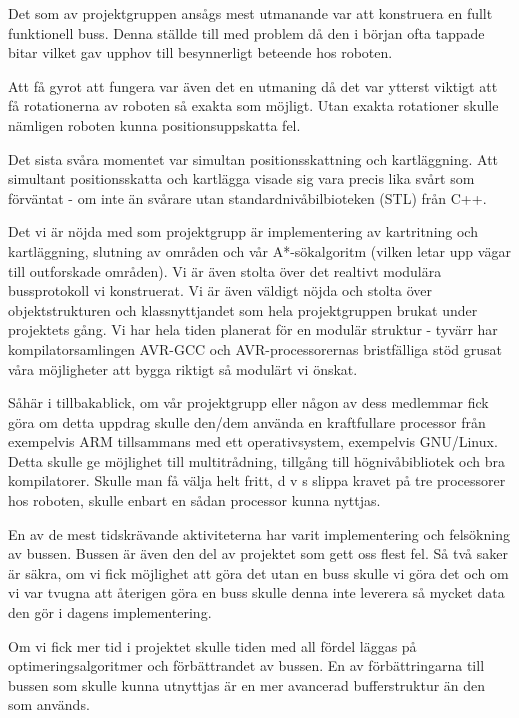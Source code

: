 \documentclass[a4paper,12pt,fleqn]{article}
\begin{document}
Det som av projektgruppen ansågs mest utmanande var att konstruera en fullt funktionell buss. Denna ställde till med problem då den i början ofta tappade bitar vilket gav upphov till besynnerligt beteende hos roboten. 

Att få gyrot att fungera var även det en utmaning då det var ytterst viktigt att få rotationerna av roboten så exakta som möjligt. Utan exakta rotationer skulle nämligen roboten kunna positionsuppskatta fel.

Det sista svåra momentet var simultan positionsskattning och kartläggning. Att simultant positionsskatta och kartlägga visade sig vara precis lika svårt som förväntat - om inte än svårare utan standardnivåbilbioteken (STL) från C++. 


Det vi är nöjda med som projektgrupp är implementering av kartritning och kartläggning, slutning av områden och vår A*-sökalgoritm (vilken letar upp vägar till outforskade områden). Vi är även stolta över det realtivt modulära bussprotokoll vi konstruerat. Vi är även väldigt nöjda och stolta över objektstrukturen och klassnyttjandet som hela projektgruppen brukat under projektets gång.
Vi har hela tiden planerat för en modulär struktur - tyvärr har kompilatorsamlingen AVR-GCC och AVR-processorernas bristfälliga stöd grusat våra möjligheter att bygga riktigt så modulärt vi önskat. 


Såhär i tillbakablick, om vår projektgrupp eller någon av dess medlemmar fick göra om detta uppdrag skulle den/dem använda en kraftfullare processor från exempelvis ARM tillsammans med ett operativsystem, exempelvis GNU/Linux. Detta skulle ge möjlighet till multitrådning, tillgång till högnivåbibliotek och bra kompilatorer. Skulle man få välja helt fritt, d v s slippa kravet på tre processorer hos roboten, skulle enbart en sådan processor kunna nyttjas. 

En av de mest tidskrävande aktiviteterna har varit implementering och felsökning av bussen. Bussen är även den del av projektet som gett oss flest fel. Så två saker är säkra, om vi fick möjlighet att göra det utan en buss skulle vi göra det och om vi var tvugna att återigen göra en buss skulle denna inte leverera så mycket data den gör i dagens implementering. 

Om vi fick mer tid i projektet skulle tiden med all fördel läggas på optimeringsalgoritmer och förbättrandet av bussen. En av förbättringarna till bussen som skulle kunna utnyttjas är en mer avancerad bufferstruktur än den som används.
\end{document}
